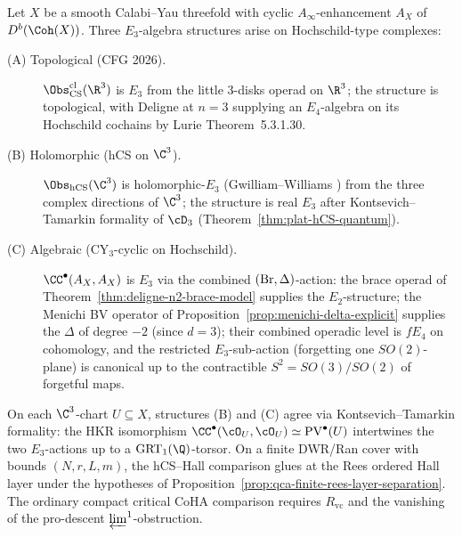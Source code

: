 \begin{theorem}
\label{thm:deligne-n3-three-e3}
Let $X$ be a smooth Calabi--Yau threefold with cyclic $A_\infty$-enhancement $A_X$ of $D^b(\Coh(X))$. Three $E_3$-algebra structures arise on Hochschild-type complexes:
\begin{description}
\item[\textup{(A) Topological (CFG 2026).}] $\Obs^{\mathrm{cl}}_{\mathrm{CS}}(\R^3)$ is $E_3$ from the little $3$-disks operad on $\R^3$; the structure is topological, with Deligne at $n = 3$ supplying an $E_4$-algebra on its Hochschild cochains by Lurie \cite{LurieHA} Theorem~5.3.1.30.

\item[\textup{(B) Holomorphic (hCS on $\C^3$).}] $\Obs_{\hCS}(\C^3)$ is holomorphic-$E_3$ (Gwilliam--Williams \cite{GwilliamWilliams}) from the three complex directions of $\C^3$; the structure is real $E_3$ after Kontsevich--Tamarkin formality of $\cD_3$ (Theorem~\ref{thm:plat-hCS-quantum}).

\item[\textup{(C) Algebraic (CY$_3$-cyclic on Hochschild).}] $\CC^\bullet(A_X, A_X)$ is $E_3$ via the combined $(\mathrm{Br}, \Delta)$-action: the brace operad of Theorem~\ref{thm:deligne-n2-brace-model} supplies the $E_2$-structure; the Menichi BV operator of Proposition~\ref{prop:menichi-delta-explicit} supplies the $\Delta$ of degree $-2$ (since $d = 3$); their combined operadic level is $fE_4$ on cohomology, and the restricted $E_3$-sub-action (forgetting one $SO(2)$-plane) is canonical up to the contractible $S^2 = SO(3)/SO(2)$ of forgetful maps.
\end{description}
On each $\C^3$-chart $U \subseteq X$, structures \textup{(B)} and \textup{(C)} agree via Kontsevich--Tamarkin formality: the HKR isomorphism $\CC^\bullet(\cO_U, \cO_U) \simeq \mathrm{PV}^\bullet(U)$ intertwines the two $E_3$-actions up to a $\mathrm{GRT}_1(\Q)$-torsor.  On a finite DWR/Ran cover with bounds \((N,r,L,m)\), the hCS--Hall comparison glues at the Rees ordered Hall layer under the hypotheses of Proposition~\ref{prop:qca-finite-rees-layer-separation}.  The ordinary compact critical CoHA comparison requires \(R_{\mathrm{vc}}\) and the vanishing of the pro-descent \(\varprojlim^1\)-obstruction.
\end{theorem}

